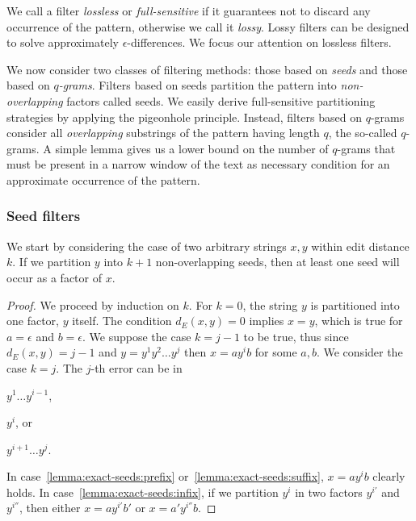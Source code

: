 We call a filter \emph{lossless} or \emph{full-sensitive} if it guarantees not to discard any occurrence of the pattern, otherwise we call it \emph{lossy}.
Lossy filters can be designed to solve approximately $\epsilon$-differences.
We focus our attention on lossless filters. 

We now consider two classes of filtering methods: those based on \emph{seeds} and those based on \emph{$q$-grams}.
Filters based on seeds partition the pattern into \emph{non-overlapping} factors called seeds.
We easily derive full-sensitive partitioning strategies by applying the pigeonhole principle.
Instead, filters based on $q$-grams consider all \emph{overlapping} substrings of the pattern having length $q$, the so-called $q$-grams.
A simple lemma gives us a lower bound on the number of $q$-grams that must be present in a narrow window of the text as necessary condition for an approximate occurrence of the pattern.

\subsubsection{Seed filters}

We start by considering the case of two arbitrary strings $x,y$ within edit distance $k$.
If we partition \wlogs $y$ into $k+1$ non-overlapping seeds, then at least one seed will occur as a factor of $x$.
\begin{proof}
We proceed by induction on $k$.
For $k=0$, the string $y$ is partitioned into one factor, $y$ itself.
The condition $d_E(x,y) = 0$ implies $x=y$, which is true for $a=\epsilon$ and $b=\epsilon$.
We suppose the case $k=j-1$ to be true, thus since $d_E(x,y) = j-1$ and $y=y^1 y^2 \dots y^{j}$ then $x=ay^ib$ for some $a, b$.
We consider the case $k=j$. The $j$-th error can be in
\begin{inparaenum}[(i)]
\item\label{lemma:exact-seeds:prefix} $y^1\dots y^{i-1}$,
\item\label{lemma:exact-seeds:infix} $y^i$, or
\item\label{lemma:exact-seeds:suffix} $y^{i+1}\dots y^{j}$.
\end{inparaenum}
In case~\ref{lemma:exact-seeds:prefix} or~\ref{lemma:exact-seeds:suffix}, $x=ay^ib$ clearly holds.
In case~\ref{lemma:exact-seeds:infix}, if we partition $y^i$ in two factors $y^{i'}$ and $y^{i''}$, then either $x=ay^{i'}b'$ or $x={a'}y^{i''}b$.
\end{proof}

